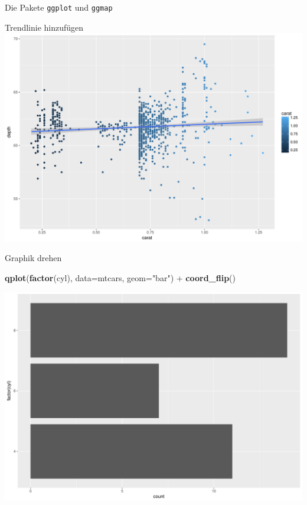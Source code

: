 \documentclass[ignorenonframetext,]{beamer}
\newenvironment{Shaded}{}{}
\newcommand{\KeywordTok}[1]{\textcolor[rgb]{0.00,0.44,0.13}{\textbf{{#1}}}}
\newcommand{\DataTypeTok}[1]{\textcolor[rgb]{0.56,0.13,0.00}{{#1}}}
\newcommand{\StringTok}[1]{\textcolor[rgb]{0.25,0.44,0.63}{{#1}}}
\newcommand{\NormalTok}[1]{{#1}}
\begin{document}
\begin{frame}[fragile]{Die Pakete \texttt{ggplot} und \texttt{ggmap}}
\begin{block}{Trendlinie hinzufügen}
\includegraphics{R_intern_files/figure-beamer/unnamed-chunk-243-1.pdf}

\end{block}

\begin{block}{Graphik drehen}

\begin{Shaded}
\begin{Highlighting}[]
\KeywordTok{qplot}\NormalTok{(}\KeywordTok{factor}\NormalTok{(cyl), }\DataTypeTok{data=}\NormalTok{mtcars, }\DataTypeTok{geom=}\StringTok{"bar"}\NormalTok{) +}\StringTok{ }
\KeywordTok{coord_flip}\NormalTok{()}
\end{Highlighting}
\end{Shaded}

\includegraphics{R_intern_files/figure-beamer/unnamed-chunk-244-1.pdf}


\end{block}
\end{frame}
\end{document}
